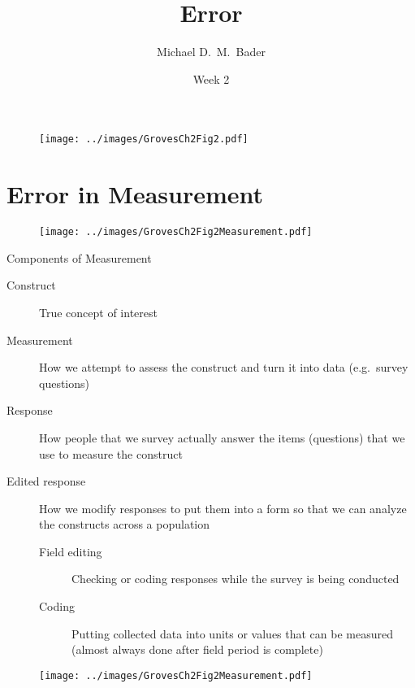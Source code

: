\documentclass[]{beamer}
\title{Error}
\author[Bader--SOCY 625]
{Michael D.~M.~Bader}
\institute 
{
  Practicum in Sociological Research (SOCY 625)
}
\date %
{Week 2}
\begin{document}
\begin{frame}
  \titlepage
\end{frame}

\begin{frame}
\begin{figure}[h!]
\begin{center}
\texttt{[image: ../images/GrovesCh2Fig2.pdf]}
\end{center}
\end{figure}
\end{frame}

\section{Error in Measurement}

\begin{frame}
\begin{figure}[h!]
\begin{center}
\texttt{[image: ../images/GrovesCh2Fig2Measurement.pdf]}
\end{center}
\end{figure}
\end{frame}

\begin{frame}{Components of Measurement}
\begin{description}
\item[Construct] True concept of interest \pause
\item[Measurement] How we attempt to assess the construct and turn it into data (e.g.\ survey questions) \pause
\item[Response] How people that we survey actually answer the items (questions) that we use to measure the construct \pause
\item[Edited response] How we modify responses to put them into a form so that we can analyze the constructs across a population \pause
\begin{description}
\item[Field editing] Checking or coding responses while the survey is being conducted
\item[Coding] Putting collected data into units or values that can be measured (almost always done after field period is complete)
\end{description}
\end{description}
\end{frame}

\begin{frame}
\begin{figure}[h!]
\begin{center}
\texttt{[image: ../images/GrovesCh2Fig2Measurement.pdf]}
\end{center}
\end{figure}
\end{frame}
\end{document}

